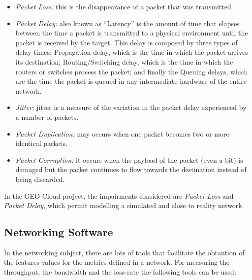 \begin{itemize}
\item \emph{Packet Loss:} this is the disappearance of a packet that was
  transmitted.
\item \emph{Packet Delay:} also known as ``Latency'' is the amount of time that elapses between the time a
  packet is transmitted to a physical environment until the packet is received by
  the target. This delay is composed by three types of delay times: Propagation
  delay, which is the time in which the packet arrives its destination;
  Routing/Switching delay, which is the time in which the routers or
  switches  process the packet; and finally the Queuing delays, which are
  the time the packet is queued in any intermediate hardware of the entire network.
\item \emph{Jitter:} jitter is a measure of the variation in the packet delay
  experienced by a number of packets.
\item \emph{Packet Duplication:} may occurs when one packet becomes two or more
  identical packets.
\item \emph{Packet Corruption:} it occurs when the payload of the packet (even a bit)
  is damaged but the packet continues to flow towards the destination instead of
  being discarded.
\end{itemize}

In the GEO-Cloud project, the impairments considered are \emph{Packet Loss} and
\emph{Packet Delay}, which permit modelling a simulated and close to reality network.


\subsection{Networking Software}

In the networking subject, there are lots of tools that facilitate the obtantion
of the
features values for the metrics defined in a network.
For measuring the throughput, the bandwidth and the loss-rate the following
tools can be used:

